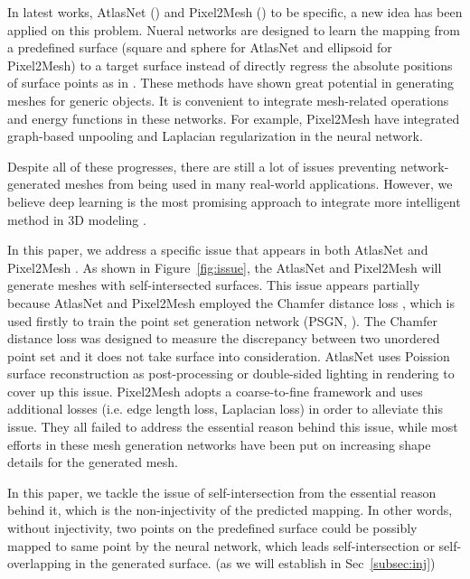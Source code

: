 In latest works, AtlasNet (\cite{atlasnet}) and Pixel2Mesh (\cite{pixel2mesh}) to be specific, a new idea has been applied on this problem. Nueral networks are designed to learn the mapping from a predefined surface (square and sphere for AtlasNet and ellipsoid for Pixel2Mesh) to a target surface instead of directly regress the absolute positions of surface points as in \cite{PSGN}. These methods have shown great potential in generating meshes for generic objects. It is convenient to integrate mesh-related operations and energy functions in these networks. For example, Pixel2Mesh have integrated graph-based unpooling and Laplacian regularization in the neural network.

Despite all of these progresses, there are still a lot of issues preventing network-generated meshes from being used in many real-world applications. However, we believe deep learning is the most promising approach to integrate more intelligent method in 3D modeling .

 In this paper, we address a specific issue that appears in both AtlasNet \cite{atlasnet} and Pixel2Mesh \cite{pixel2mesh}. As shown in Figure~\ref{fig:issue}, the AtlasNet and Pixel2Mesh will generate meshes with self-intersected surfaces. This issue appears partially because AtlasNet and Pixel2Mesh employed the Chamfer distance loss , which is used firstly to train the point set generation network (PSGN, \cite{PSGN}). The Chamfer distance loss was designed to measure the discrepancy between two unordered point set and it does not take surface into consideration. AtlasNet uses Poission surface reconstruction as post-processing or double-sided lighting in rendering to cover up this issue. Pixel2Mesh adopts a coarse-to-fine framework and uses additional losses (i.e. edge length loss, Laplacian loss) in order to alleviate this issue. They all failed to address the essential reason behind this issue, while most efforts in these mesh generation networks have been put on increasing shape details for the generated mesh.

In this paper, we tackle the issue of self-intersection from the essential reason behind it, which is the non-injectivity of the predicted mapping. In other words, without injectivity,  two points on the predefined surface could be possibly mapped to same point by the neural network, which leads self-intersection or self-overlapping in the generated surface. (as we will establish in Sec~\ref{subsec:inj})

